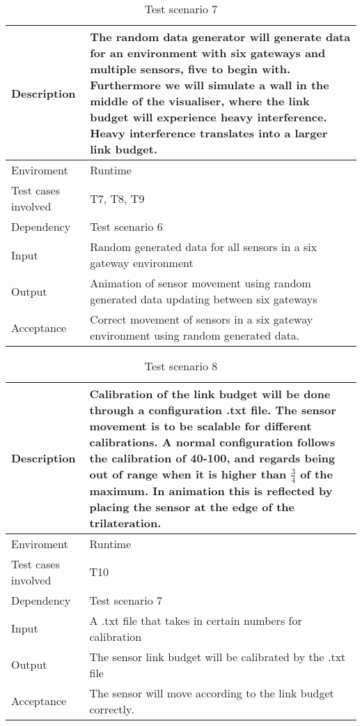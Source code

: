 \documentclass[../document]{subfiles}
\begin{document}
\begin{table}[H]
\caption{Test scenario 7}
\centering
\begin{tabularx}{\textwidth}{|L{3cm}|X|}
	\hline
	Description
	&The random data generator will generate data for an environment with six gateways and multiple sensors, five to begin with. Furthermore we will simulate a wall in the middle of the visualiser, where the link budget will experience heavy interference. Heavy interference translates into a larger link budget.
	\\ \hline Enviroment
	&Runtime
	\\ \hline Test cases involved
	&T7, T8, T9
	\\ \hline Dependency
	&Test scenario 6
	\\ \hline Input
	&Random generated data for all sensors in a six gateway environment
	\\ \hline Output
	&Animation of sensor movement using random generated data updating between six gateways
	\\ \hline Acceptance
	&Correct movement of sensors in a six gateway environment using random generated data.
	\\ \hline 
\end{tabularx}
\end{table}

\begin{table}[H]
\caption{Test scenario 8}
\centering
\begin{tabularx}{\textwidth}{|L{3cm}|X|}
	\hline
	Description
	&Calibration of the link budget will be done through a configuration .txt file. The sensor movement is to be scalable for different calibrations. A normal configuration follows the calibration of 40-100, and regards being out of range when it is higher than $\frac{3}{4}$ of the maximum. In animation this is reflected by placing the sensor at the edge of the trilateration.
	\\ \hline Enviroment
	&Runtime
	\\ \hline Test cases involved
	&T10
	\\ \hline Dependency
	&Test scenario 7
	\\ \hline Input
	&A .txt file that takes in certain numbers for calibration
	\\ \hline Output
	&The sensor link budget will be calibrated by the .txt file
	\\ \hline Acceptance
	&The sensor will move according to the link budget correctly.
	\\ \hline 
\end{tabularx}
\end{table}
\end{document}
